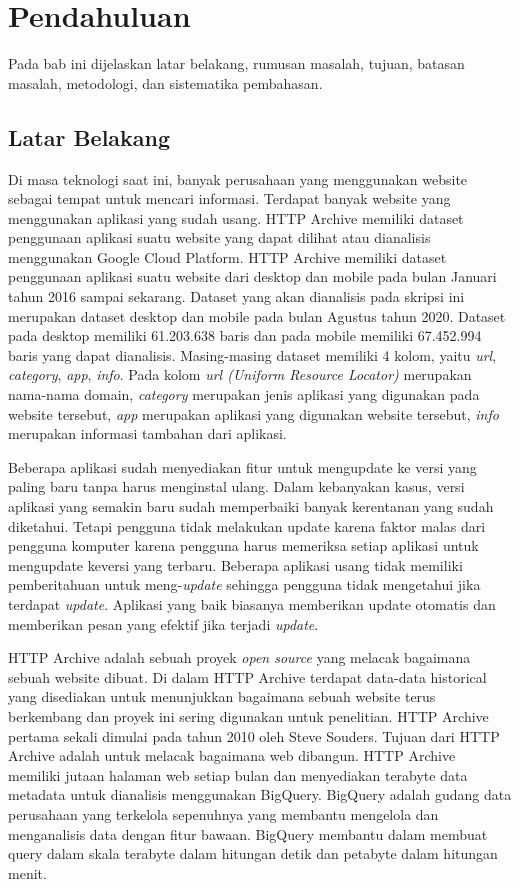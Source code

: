 \chapter{Pendahuluan}
\label{chap:intro}
Pada bab ini dijelaskan latar belakang, rumusan masalah, tujuan, batasan masalah, metodologi, dan sistematika pembahasan.
\section{Latar Belakang}
\label{sec:label}
Di masa teknologi saat ini, banyak perusahaan yang menggunakan website sebagai tempat untuk mencari informasi. Terdapat banyak website yang menggunakan aplikasi yang sudah usang. HTTP Archive memiliki dataset penggunaan aplikasi suatu website yang dapat dilihat atau dianalisis menggunakan Google Cloud Platform. HTTP Archive memiliki dataset penggunaan aplikasi suatu website dari desktop dan mobile pada bulan Januari tahun 2016 sampai sekarang. Dataset yang akan dianalisis pada skripsi ini merupakan dataset desktop dan mobile pada bulan Agustus tahun 2020. Dataset pada desktop memiliki 61.203.638 baris dan pada mobile memiliki 67.452.994 baris yang dapat dianalisis. Masing-masing dataset memiliki 4 kolom, yaitu \textit{url}, \textit{category}, \textit{app}, \textit{info}. Pada kolom \textit{url (Uniform Resource Locator)} merupakan nama-nama domain, \textit{category} merupakan jenis aplikasi yang digunakan pada website tersebut, \textit{app} merupakan aplikasi yang digunakan website tersebut, \textit{info} merupakan informasi tambahan dari aplikasi. 

Beberapa aplikasi sudah menyediakan fitur untuk mengupdate ke versi yang paling baru tanpa harus menginstal ulang. Dalam kebanyakan kasus, versi aplikasi yang semakin baru sudah memperbaiki banyak kerentanan yang sudah diketahui. Tetapi pengguna tidak melakukan update karena faktor malas dari pengguna komputer karena pengguna harus memeriksa setiap aplikasi untuk mengupdate keversi yang terbaru. Beberapa aplikasi usang tidak memiliki pemberitahuan untuk meng-\textit{update} sehingga pengguna tidak mengetahui jika terdapat \textit{update}. Aplikasi yang baik biasanya memberikan update otomatis dan memberikan pesan yang efektif jika terjadi \textit{update}. 

HTTP Archive adalah sebuah proyek \textit{open source} yang melacak bagaimana sebuah website dibuat. Di dalam HTTP Archive terdapat data-data historical yang disediakan untuk menunjukkan bagaimana sebuah website terus berkembang dan proyek ini sering digunakan untuk penelitian. HTTP Archive pertama sekali dimulai pada tahun 2010 oleh Steve Souders. Tujuan dari HTTP Archive adalah untuk melacak bagaimana web dibangun. HTTP Archive memiliki jutaan halaman web setiap bulan dan menyediakan terabyte data metadata untuk dianalisis menggunakan BigQuery. BigQuery adalah gudang data perusahaan yang terkelola sepenuhnya yang membantu mengelola dan menganalisis data dengan fitur bawaan. BigQuery membantu dalam membuat query dalam skala terabyte dalam hitungan detik dan petabyte dalam hitungan menit.

